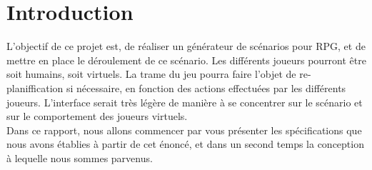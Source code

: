 \documentclass[asi]{picINSA}
\begin{document}
	
	\couverture{}

\tableofcontents{}

\chapter{Introduction}
L'objectif de ce projet est, de réaliser un générateur de scénarios pour RPG, et de mettre en place le déroulement de ce scénario. Les différents joueurs pourront être soit humains, soit virtuels. La trame du jeu pourra faire l'objet de re-planiffication si nécessaire, en fonction des actions effectuées par les différents joueurs. L'interface serait très légère de manière à se concentrer sur le scénario et sur le comportement des joueurs virtuels. \\

Dans ce rapport, nous allons commencer par vous présenter les spécifications que nous avons établies à partir de cet énoncé, et dans un second temps la conception à lequelle nous sommes parvenus.
\end{document}
